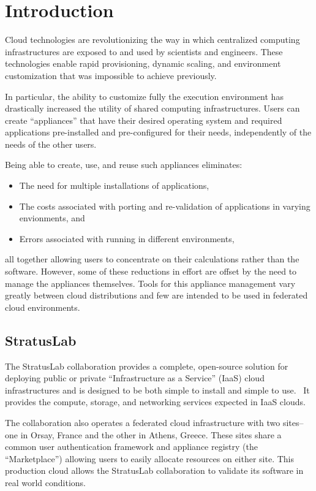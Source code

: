 \section{Introduction}
\label{sec:Introduction}

Cloud technologies are revolutionizing the way in which centralized
computing infrastructures are exposed to and used by scientists and
engineers.  These technologies enable rapid provisioning, dynamic
scaling, and environment customization that was impossible to achieve
previously. 

In particular, the ability to customize fully the execution
environment has drastically increased the utility of shared computing
infrastructures.  Users can create ``appliances'' that have their
desired operating system and required applications pre-installed
and pre-configured for their needs, independently of the needs of the
other users.

Being able to create, use, and reuse such appliances eliminates:
\begin{itemize}
\item The need for multiple installations of applications,
\item The costs associated with porting and re-validation of
  applications in varying envionments, and
\item Errors associated with running in different environments,
\end{itemize}
all together allowing users to concentrate on their calculations
rather than the software.  However, some of these reductions in effort
are offset by the need to manage the appliances themselves.  Tools for
this appliance management vary greatly between cloud distributions and
few are intended to be used in federated cloud environments.

\subsection{StratusLab}

The StratusLab collaboration provides a complete, open-source solution
for deploying public or private ``Infrastructure as a Service'' (IaaS)
cloud infrastructures and is designed to be both simple to install and
simple to use.~\cite{slbook} It provides the compute, storage, and
networking services expected in IaaS clouds.

The collaboration also operates a federated cloud infrastructure with
two sites--one in Orsay, France and the other in Athens, Greece\@.
These sites share a common user authentication framework and appliance
registry (the ``Marketplace'') allowing users to easily allocate
resources on either site.  This production cloud allows the StratusLab
collaboration to validate its software in real world conditions.

